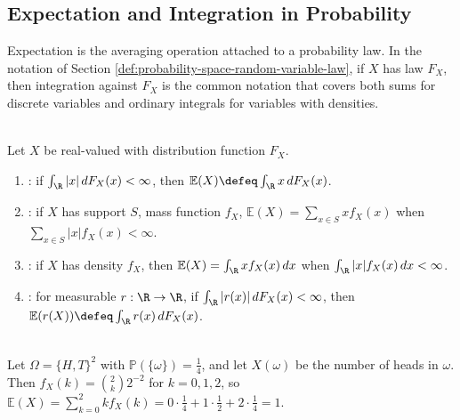 \subsection{Expectation and Integration in Probability}

Expectation is the averaging operation attached to a probability law. In the notation of Section \ref{def:probability-space-random-variable-law}, if $X$ has law $F_X$, then integration against $F_X$ is the common notation that covers both sums for discrete variables and ordinary integrals for variables with densities.

\begin{definition} \label{def:expectation-discrete-continuous-and-functionals} \\
Let $X$ be real-valued with distribution function $F_X$.
\begin{enumerate}[label=(\roman*)]
\setlength{\itemsep}{0pt}
\item {}: if $\int_{\R}|x|\,dF_X(x)<\infty$, then $\mathbb{E}(X)\defeq\int_{\R}x\,dF_X(x)$.
\item {}: if $X$ has support $S$, mass function $f_X$, $\mathbb{E}(X)=\sum\limits_{x\in S}xf_X(x)$ when $\sum\limits_{x\in S}|x|f_X(x)<\infty$.
\item {}: if $X$ has density $f_X$, then $\mathbb{E}(X)=\int_{\R}xf_X(x)\,dx$ when $\int_{\R}|x|f_X(x)\,dx<\infty$.
\item {}: for measurable $r:\R\to\R$, if $\int_{\R}|r(x)|\,dF_X(x)<\infty$, then $\mathbb{E}(r(X))\defeq\int_{\R}r(x)\,dF_X(x)$.
\end{enumerate}
\end{definition}

\begin{example} \label{ex:expectation-from-two-coin-count} \\
Let $\Omega=\{H,T\}^2$ with $\mathbb{P}(\{\omega\})=\frac{1}{4}$, and let $X(\omega)$ be the number of heads in $\omega$.\\
Then $f_X(k)=\binom{2}{k}2^{-2}$ for $k=0,1,2$, so $\mathbb{E}(X)=\sum\limits_{k=0}^{2}k f_X(k)=0\cdot\frac{1}{4}+1\cdot\frac{1}{2}+2\cdot\frac{1}{4}=1$.
\end{example}

